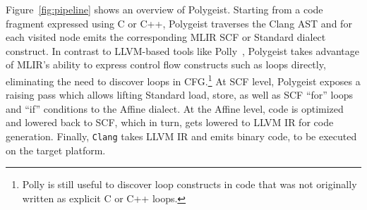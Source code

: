 \documentclass[sigplan]{acmart}
\newcommand{\icode}[1]{{\texttt {#1}}}
\newcommand{\tool}{Polygeist\xspace}
\begin{document}

Figure~\ref{fig:pipeline} shows an overview of \tool. Starting from a code fragment expressed using C or C++, \tool traverses the Clang AST and for each visited node emits the corresponding MLIR SCF or Standard dialect construct. In contrast to LLVM-based tools like Polly~\cite{grosser.ppl.2012}, \tool takes advantage of MLIR's ability to express control flow constructs such as loops directly, eliminating the need to discover loops in CFG.\footnote{Polly is still useful to discover loop constructs in code that was not originally written as explicit C or C++ loops.}
At SCF level, \tool exposes a raising pass which allows lifting Standard load, store, as well as SCF ``for'' loops and ``if'' conditions to the Affine dialect. At the Affine level, code is optimized and lowered back to SCF, which in turn, gets lowered to LLVM IR for code generation. Finally, \icode{Clang} takes LLVM IR and emits binary code, to be executed on the target platform.
\end{document}
